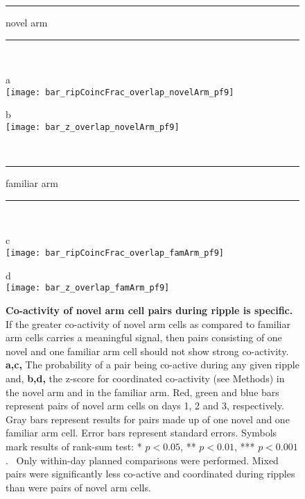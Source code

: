 \documentclass[preprint,rmp,preprintnumbers,floatfix]{revtex4}
\newcommand{\pvallt}[1]{$p < #1$}
\newcommand{\ranksum}{Symbols mark results of rank-sum test:  * \pvallt{0.05},
** \pvallt{0.01}, *** \pvallt{0.001}.\ }
\begin{document}
\newpage %
\begin{figure}[htbp]
    \centering
    \parbox[t]{3in} {
        \rule{.9in}{1pt} \hfill
        novel arm 
        \hfill \rule{0.9in}{1pt} \\
        \parbox[t]{1.4in} { {\sf a}\hfill \mbox{} \\
            \texttt{[image: bar\_ripCoincFrac\_overlap\_novelArm\_pf9]}
        } \hfill
        \parbox[t]{1.4in} { {\sf b} \hfill \mbox{} \\
            \texttt{[image: bar\_z\_overlap\_novelArm\_pf9]}
        }
    } \\ \vskip5mm
    \parbox[t]{3in} {
        \rule{.8in}{1pt} \hfill
        familiar arm 
        \hfill \rule{0.8in}{1pt} \\
        \parbox[t]{1.4in} { {\sf c} \hfill \mbox{} \\
            \texttt{[image: bar\_ripCoincFrac\_overlap\_famArm\_pf9]}
        } \hfill
        \parbox[t]{1.4in} { {\sf d} \hfill \mbox{} \\
            \texttt{[image: bar\_z\_overlap\_famArm\_pf9]}
        }
    }
    \caption{  {\bf Co-activity of novel arm cell pairs during ripple is specific.}
    If the greater co-activity of novel arm cells as compared to familiar arm
    cells carries a meaningful signal, then pairs consisting of one novel and
    one familiar arm cell should not show strong co-activity.  
    {\bf a,c,} The probability of a pair being co-active during any given ripple
    and, 
    {\bf b,d,} the z-score for coordinated co-activity (see Methods) in the
    novel arm and in the familiar arm.  
    Red, green and blue bars represent pairs of novel arm cells on days 1, 2 and
    3, respectively.  Gray bars represent results for pairs made up of one novel
    and one familiar arm cell.  
    Error bars represent standard errors.  \ranksum
    Only within-day
    planned comparisons were performed. 
    Mixed pairs were significantly less co-active and coordinated during ripples
    than were pairs of novel arm cells.
    }
\end{figure}
\end{document}
